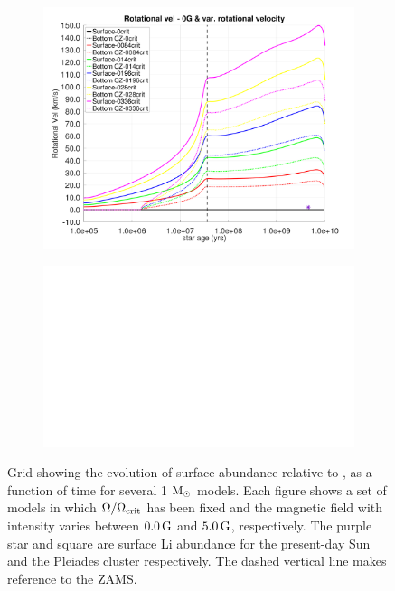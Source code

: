 \documentclass[fleqn,usenatbib]{mnras}
\begin{document}
\begin{figure}
\begin{subfigure}[h]{0.47\textwidth}
    \includegraphics[clip,width=\textwidth]{figures/paper2/rot_vel_var_vel_0_0g_0.pdf}
    \label{fig:subim23}
    \end{subfigure}    
    \begin{subfigure}[h]{0.47\textwidth}
    \includegraphics[width=\textwidth]{figures/blank.eps}
    \label{fig:subim24}
    \end{subfigure}
\caption{Grid showing the evolution of surface  abundance relative to , as a function of time for several 1 $\mathrm{M}_\odot$ models. Each figure shows a set of models in which $\Omega / \Omega_{\mathrm{crit}}$ has been fixed and the magnetic field with intensity varies between $0.0\,\mathrm{G}$ and $5.0\,\mathrm{G}$, respectively. The purple star and square are surface Li abundance for the present-day Sun \citep{Asplund2009} and the Pleiades cluster \citep{Sestito2005} respectively. The dashed vertical line makes reference to the ZAMS.}
\label{fig:grid_li_var_g}
\end{figure}
\end{document}
